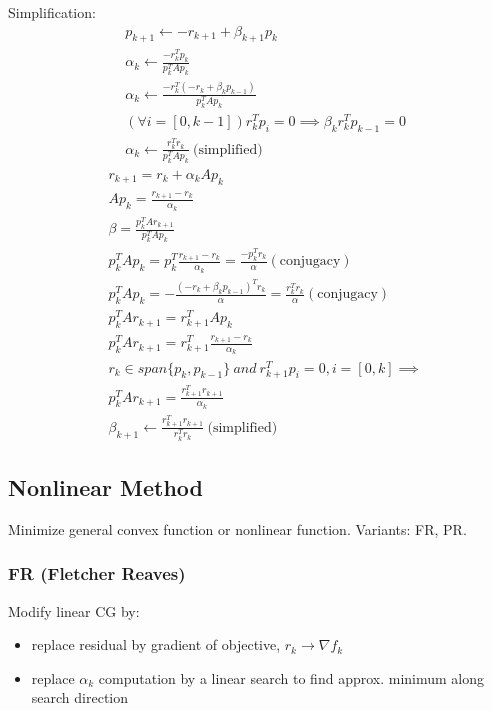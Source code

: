 \documentclass[8pt,letter]{article}
\begin{document}
\begin{multicols*}{2}
  \vfill\null
  \columnbreak
  
  Simplification:
  \begin{align*}
    &p_{k+1} \leftarrow -r_{k+1} + \beta_{k+1} p_k\\
    &\alpha_k \leftarrow \frac{-r_k^Tp_k}{p_k^T A p_k}\\
    &\alpha_k \leftarrow \frac{-r_k^T(-r_{k} + \beta_{k} p_{k-1})}{p_k^T A p_k}\\
    &(\forall i=[0,k-1]) r_k^T p_i=0 \implies \beta_k r_k^T p_{k-1}=0\\
    &\alpha_k \leftarrow \frac{r_k^T r_k}{p_k^T A p_k} \ \text{(simplified)}
  \end{align*}
  \begin{align*}
    &r_{k+1}=r_k+\alpha_k A p_k\\
    &A p_k = \frac{r_{k+1}-r_k}{\alpha_k}\\
    &\beta = \frac{p_k^T A r_{k+1}}{p_k^T A p_k}\\
    &p_k^T A p_k = p_k^T \frac{r_{k+1}-r_k}{\alpha_k}= \frac{-p_k^T r_k}{\alpha} (\text{conjugacy})\\
    &p_k^T A p_k = -\frac{(- r_k + \beta_k p_{k-1})^T r_k}{\alpha}=\frac{r_k^T r_k}{\alpha} (\text{conjugacy})\\
    &p_k^T A r_{k+1} = r_{k+1}^T A p_k\\
    &p_k^T A r_{k+1} = r_{k+1}^T \frac{r_{k+1}-r_k}{\alpha_k}\\
    &r_k \in span\{p_k,p_{k-1}\}\ and\ r_{k+1}^T p_i = 0, i=[0,k] \implies\\
    &p_k^T A r_{k+1} = \frac{r_{k+1}^T r_{k+1}}{\alpha_k}\\
    &\beta_{k+1} \leftarrow \frac{r_{k+1}^T r_{k+1}}{r_k^T r_k} \ \text{(simplified)}
  \end{align*}

  \subsection{Nonlinear Method}
  Minimize general convex function or nonlinear function. Variants: FR, PR.

  \subsubsection{FR (Fletcher Reaves)}
  Modify linear CG by:
  \begin{itemize}
  \item replace residual by gradient of objective, $r_k \rightarrow \nabla f_k$
  \item replace $\alpha_k$ computation by a linear search to find approx. minimum along search direction
  \end{itemize}


\end{multicols*}
\end{document}
